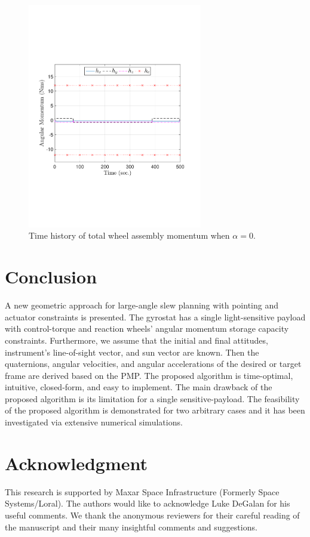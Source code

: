 \documentclass[journal ]{new-aiaa}
\begin{document}
\begin{figure}[htb!]
	\centering
	\begin{minipage}{.5\textwidth}
		\centering
		\includegraphics[width=3in]{total_angular_momentum_alpha0}
	\end{minipage}%
	\caption{Time history of total wheel assembly momentum when $\alpha=0$.}
	\label{fig:quats_phi_total0}
\end{figure}
				
			
	\newpage
	\section{Conclusion}
	 A new geometric approach for large-angle slew planning with pointing and actuator constraints is presented. The gyrostat has a single light-sensitive payload with control-torque and reaction wheels' angular momentum storage capacity constraints. Furthermore, we assume that the initial and final attitudes, instrument's line-of-sight vector, and sun vector are known. Then the quaternions, angular velocities, and angular accelerations of the desired or target frame are derived based on the PMP.  The proposed algorithm is time-optimal, intuitive, closed-form, and easy to implement. The main drawback of the proposed algorithm is its limitation for a single sensitive-payload. The feasibility of the proposed algorithm is demonstrated for two arbitrary cases and it has been investigated via extensive numerical simulations.
	\section{Acknowledgment}
	This research is supported by Maxar Space Infrastructure (Formerly Space Systems/Loral). The authors would like to acknowledge Luke DeGalan for his useful comments. We thank the anonymous reviewers for their careful reading of the manuscript and their many insightful comments and suggestions.
	
	
	
	
\end{document}
